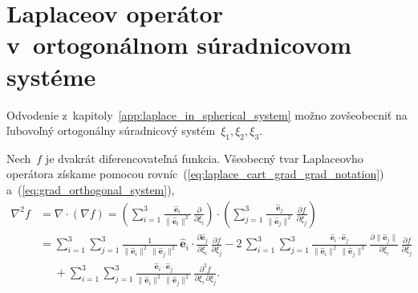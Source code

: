 \documentclass[a4paper, 12pt]{book}
\let\vec\mathbf
\begin{document}
\section{Laplaceov operátor v~ortogonálnom súradnicovom systéme}
\label{app:laplace_in_orthogonal_coordinates}

Odvodenie z~kapitoly~\ref{app:laplace_in_spherical_system} možno zovšeobecniť 
na ľubovoľný ortogonálny súradnicový systém~$\xi_1, \xi_2, \xi_3$.

Nech~$f$ je dvakrát diferencovateľná funkcia.  Všeobecný tvar Laplaceovho 
operátora získame pomocou rovníc~(\ref{eq:laplace_cart_grad_grad_notation}) 
a~(\ref{eq:grad_orthogonal_system}),
%
\begin{equation}
\label{eq:laplace_orthogonal_system_1}
\begin{split}
\nabla^2 f &= \nabla \cdot \left( \nabla f \right) = \left( \sum_{i = 1}^3 
\frac{\hat{\vec e}_i}{\| \hat{\vec e}_i \|^2} \, \frac{\partial}{\partial 
\xi_i}\right) \cdot \left( \sum_{j = 1}^3 \frac{\hat{\vec e}_j}{\| \hat{\vec 
e}_j \|^2} \, \frac{\partial f}{\partial \xi_j}
\right)\\
%
&= \sum_{i = 1}^{3} \sum_{j = 1}^3 \frac{1}{\| \hat{\vec e}_i \|^2 \, \| 
\hat{\vec e}_j \|^2} \, \hat{\vec e}_i \cdot \frac{\partial \hat{\vec 
e}_j}{\partial \xi_i} \, \frac{\partial f}{\partial \xi_j}
- 2\, \sum_{i = 1}^{3} \sum_{j = 1}^3 \frac{\hat{\vec e}_i \cdot \hat{\vec 
e}_j}{\| \hat{\vec e}_i \|^2 \, \|\hat{\vec e}_j \|^3} \, \frac{\partial \| 
\hat{\vec e}_j \|}{\partial \xi_i} \, \frac{\partial f}{\partial \xi_j}\\
%
&\phantom{={}}+ \sum_{i = 1}^{3} \sum_{j = 1}^3 \frac{\hat{\vec e}_i \cdot 
\hat{\vec e}_j}{\| \hat{\vec e}_i \|^2 \, \| \hat{\vec e}_j \|^2} \, 
\frac{\partial^2 f}{\partial \xi_i \, \partial \xi_j}{.}
\end{split}
%
\end{equation}
\end{document}
